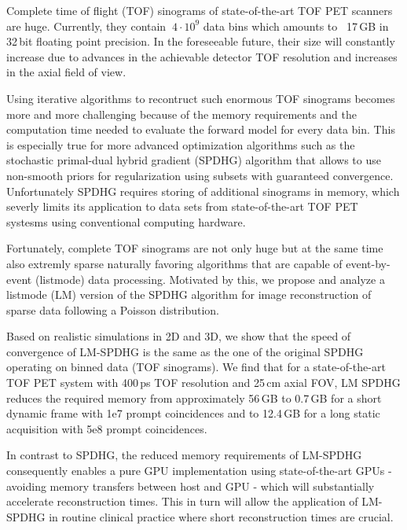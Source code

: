 Complete time of flight (TOF) sinograms of state-of-the-art TOF PET scanners are huge.
Currently, they contain $~4 \cdot 10^9$ data bins which amounts to ~17\,GB in 32\,bit floating 
point precision.
In the foreseeable future, their size will constantly increase due to advances in the 
achievable detector TOF resolution and increases in the axial field of view.

Using iterative algorithms to recontruct such enormous TOF sinograms becomes more and more
challenging because of the memory requirements and the computation time needed to evaluate the
forward model for every data bin.
This is especially true for more advanced optimization algorithms such as the
stochastic primal-dual hybrid gradient (SPDHG) algorithm that allows to use non-smooth priors
for regularization using subsets with guaranteed convergence.
Unfortunately SPDHG requires storing of additional sinograms in memory, which severly limits
its application to data sets from state-of-the-art TOF PET systesms using conventional
computing hardware.

Fortunately, complete TOF sinograms are not only huge but at the same time also extremly
sparse naturally favoring algorithms that are capable of event-by-event (listmode) data
processing.
Motivated by this, we propose and analyze a listmode (LM) version of the SPDHG algorithm 
for image reconstruction of sparse data following a Poisson distribution.

Based on realistic simulations in 2D and 3D, we show that the speed of convergence of LM-SPDHG 
is the same as the one of the original SPDHG operating on binned data (TOF sinograms).
We find that for a state-of-the-art TOF PET system with 400\,ps TOF resolution and 25\,cm axial FOV,
LM SPDHG reduces the required memory from approximately 56\,GB to
0.7\,GB for a short dynamic frame with 1e7 prompt coincidences and to 12.4\,GB for a long 
static acquisition with 5e8 prompt coincidences.

In contrast to SPDHG, the reduced memory requirements of LM-SPDHG consequently enables 
a pure GPU implementation using state-of-the-art GPUs - avoiding memory transfers
between host and GPU - which will substantially accelerate reconstruction times.
This in turn will allow the application of LM-SPDHG in routine clinical practice where short
reconstruction times are crucial.
